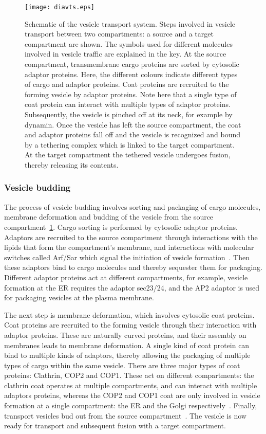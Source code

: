 \begin{figure}
	\texttt{[image: diavts.eps]}
	\caption{Schematic of the vesicle transport system. Steps involved in vesicle transport between two compartments: a source and a target compartment are shown. 
	The symbols used for different molecules involved in vesicle traffic are explained in the key. At the source compartment, transmembrane cargo proteins are sorted by cytosolic adaptor proteins. 
	Here, the different colours indicate different types of cargo and adaptor proteins. Coat proteins are recruited to the forming vesicle by adaptor proteins. 
	Note here that a single type of coat protein can interact with multiple types of adaptor proteins. Subsequently, the vesicle is pinched off at its neck, for example by dynamin. 
	Once the vesicle has left the source compartment, the coat and adaptor proteins fall off and the vesicle is recognized and bound by a tethering complex which is linked to the target compartment. 
	At the target compartment the tethered vesicle undergoes fusion, thereby releasing its contents.}
    \label{fig:vts}
\end{figure}

\subsubsection{Vesicle budding} The process of vesicle budding involves sorting and packaging of cargo molecules, membrane deformation and budding of the vesicle from the source compartment~\ref{fig:vts}.
%
Cargo sorting is performed by cytosolic adaptor proteins. 
Adaptors are recruited to the source compartment through interactions with the lipids that form the compartment's membrane, and interactions with molecular switches called Arf/Sar which signal the initiation of vesicle formation~\cite{paczkowski2015cargo}. 
%
Then these adaptors bind to cargo molecules and thereby sequester them for packaging. 
%
Different adaptor proteins act at different compartments, for example, vesicle formation at the ER requires the adaptor sec23/24, and the AP2 adaptor is used for packaging vesicles at the plasma membrane.
%

The next step is membrane deformation, which involves cytosolic coat proteins. 
%
Coat proteins are recruited to the forming vesicle through their interaction with adaptor proteins. 
%
These are naturally curved proteins, and their assembly on membranes leads to membrane deformation.
%
A single kind of coat protein can bind to multiple kinds of adaptors, thereby allowing the packaging of multiple types of cargo within the same vesicle. 
%
There are three major types of coat proteins: Clathrin, COP2 and COP1. These act on different compartments: the clathrin coat operates at multiple compartments, and can interact with multiple adaptors proteins, whereas the COP2 and COP1 coat are only involved in vesicle formation at a single compartment: the ER and the Golgi respectively~\cite{faini2013vesicle}.
%
Finally, transport vesicles bud out from the source compartment~\cite{cocucci2014dynamin}.
%
The vesicle is now ready for transport and subsequent fusion with a target compartment.

